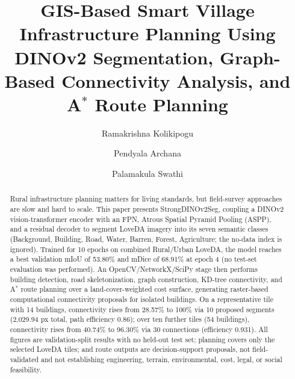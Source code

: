 \documentclass[runningheads]{llncs}
\begin{document}
%
\title{GIS-Based Smart Village Infrastructure Planning Using DINOv2 Segmentation, Graph-Based Connectivity Analysis, and A$^{*}$ Route Planning}
%
%
\author{Ramakrishna Kolikipogu\and Pendyala Archana\and Palamakula Swathi}
%
%
%
\maketitle
%
\begin{abstract}
Rural infrastructure planning matters for living standards, but field-survey approaches are slow and hard to scale. This paper presents StrongDINOv2Seg, coupling a DINOv2 vision-transformer encoder with an FPN, Atrous Spatial Pyramid Pooling (ASPP), and a residual decoder to segment LoveDA imagery into its seven semantic classes (Background, Building, Road, Water, Barren, Forest, Agriculture; the no-data index is ignored). Trained for 10 epochs on combined Rural/Urban LoveDA, the model reaches a best validation mIoU of 53.80\% and mDice of 68.91\% at epoch 4 (no test-set evaluation was performed). An OpenCV/NetworkX/SciPy stage then performs building detection, road skeletonization, graph construction, KD-tree connectivity, and A$^{*}$ route planning over a land-cover-weighted cost surface, generating raster-based computational connectivity proposals for isolated buildings. On a representative tile with 14 buildings, connectivity rises from 28.57\% to 100\% via 10 proposed segments (2,029.94 px total, path efficiency 0.86); over ten further tiles (54 buildings), connectivity rises from 40.74\% to 96.30\% via 30 connections (efficiency 0.931). All figures are validation-split results with no held-out test set; planning covers only the selected LoveDA tiles; and route outputs are decision-support proposals, not field-validated and not establishing engineering, terrain, environmental, cost, legal, or social feasibility.
\end{abstract}
%
\end{document}

